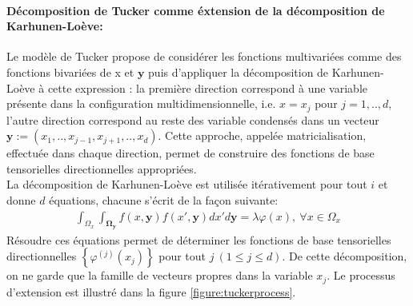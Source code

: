 \paragraph{Décomposition de Tucker comme éxtension de la décomposition de Karhunen-Loève:\\}
\hspace{0.5cm} Le modèle de Tucker propose de considérer les fonctions multivariées comme des fonctions bivariées de x et $\mathbf{y}$ puis d'appliquer la décomposition de Karhunen-Loève à cette expression : la première direction correspond à une variable présente dans la configuration multidimensionnelle, i.e. $x=x_j$ pour $j=1,..,d$,
l'autre direction correspond au reste des variable condensés dans un vecteur $\mathbf{y}:=(x_1,..,x_{j-1}, x_{j+1}, .., x_d)$. Cette approche, appelée matricialisation, effectuée dans chaque direction, permet de construire des fonctions de base tensorielles directionnelles appropriées.\\
La décomposition de Karhunen-Loève est utilisée itérativement pour tout $i$ et donne $d$ équations, chacune s'écrit de la façon suivante:
\begin{align}
		\int_{\Omega_{x}} \int_{\mathbf{\Omega_{y}}} f(x,\mathbf{y}) f(x',\mathbf{y})dx'd\mathbf{y} = \lambda \varphi(x),\ \forall x \in \Omega_x \nonumber
\end{align}
\hspace{0.5cm} Résoudre ces équations permet de déterminer les fonctions de base tensorielles directionnelles $\left \{ \varphi^{(j)}(x_j) \right \}$ pour tout $j\ (1 \leq j \leq d)$. De cette décomposition, on ne garde que la famille de vecteurs propres dans la variable $x_j$. Le processus d'extension est illustré dans la figure \ref{figure:tuckerprocess}.

